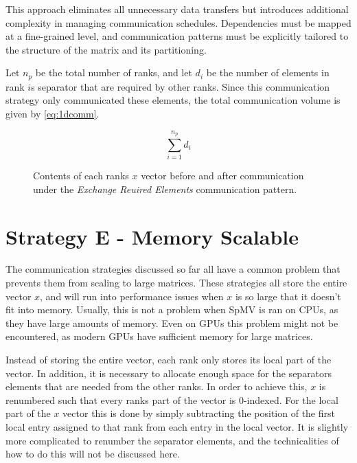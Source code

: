 This approach eliminates all unnecessary data transfers but introduces additional complexity in managing communication schedules. Dependencies must be mapped at a fine-grained level, and communication patterns must be explicitly tailored to the structure of the matrix and its partitioning.
\medskip

Let \(n_{p}\) be the total number of ranks, and let \(d_{i}\) be the number of elements in rank \(i\)s separator that are required by other ranks. Since this communication strategy only communicated these elements, the total communication volume is given by \ref{eq:1dcomm}.

\begin{equation}
    \label{eq:1dcomm}
    \sum_{i=1}^{n_{p}} d_{i} 
\end{equation}



\begin{figure}[ht]
    \centering
    \caption{Contents of each ranks \(x\) vector before and after communication under the \textit{Exchange Reuired Elements} communication pattern.}
    \label{fig:1dcomm}
\end{figure}


\section{Strategy E - Memory Scalable}
The communication strategies discussed so far all have a common problem that prevents them from scaling to large matrices. These strategies all store the entire vector \(x\), and will run into performance issues when \(x\) is so large that it doesn't fit into memory. Usually, this is not a problem when SpMV is ran on CPUs, as they have large amounts of memory. Even on GPUs this problem might not be encountered, as modern GPUs have sufficient memory for large matrices.
\medskip

Instead of storing the entire vector, each rank only stores its local part of the vector. In addition, it is necessary to allocate enough space for the separators elements that are needed from the other ranks. In order to achieve this, \(x\) is renumbered such that every ranks part of the vector is 0-indexed. For the local part of the \(x\) vector this is done by simply subtracting the position of the first local entry assigned to that rank from each entry in the local vector. It is slightly more complicated to renumber the separator elements, and the technicalities of how to do this will not be discussed here.
\medskip

